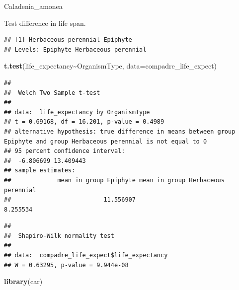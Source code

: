 \documentclass[
]{book}
\newenvironment{Shaded}{\begin{snugshade}}{\end{snugshade}}
\newcommand{\AttributeTok}[1]{\textcolor[rgb]{0.13,0.29,0.53}{#1}}
\newcommand{\CommentTok}[1]{\textcolor[rgb]{0.56,0.35,0.01}{\textit{#1}}}
\newcommand{\FunctionTok}[1]{\textcolor[rgb]{0.13,0.29,0.53}{\textbf{#1}}}
\newcommand{\NormalTok}[1]{#1}
\newcommand{\SpecialCharTok}[1]{\textcolor[rgb]{0.81,0.36,0.00}{\textbf{#1}}}
\theoremstyle{definition}
\theoremstyle{definition}
\theoremstyle{definition}
\theoremstyle{definition}
\theoremstyle{remark}
\begin{document}
Caladenia\_amonea

Test difference in life span.

\begin{Shaded}
\end{Shaded}

\begin{verbatim}
## [1] Herbaceous perennial Epiphyte            
## Levels: Epiphyte Herbaceous perennial
\end{verbatim}

\begin{Shaded}
\begin{Highlighting}[]
\FunctionTok{t.test}\NormalTok{(life\_expectancy}\SpecialCharTok{\textasciitilde{}}\NormalTok{OrganismType, }\AttributeTok{data=}\NormalTok{compadre\_life\_expect)}
\end{Highlighting}
\end{Shaded}

\begin{verbatim}
## 
##  Welch Two Sample t-test
## 
## data:  life_expectancy by OrganismType
## t = 0.69168, df = 16.201, p-value = 0.4989
## alternative hypothesis: true difference in means between group Epiphyte and group Herbaceous perennial is not equal to 0
## 95 percent confidence interval:
##  -6.806699 13.409443
## sample estimates:
##             mean in group Epiphyte mean in group Herbaceous perennial 
##                          11.556907                           8.255534
\end{verbatim}

\begin{Shaded}
\end{Shaded}

\begin{verbatim}
## 
##  Shapiro-Wilk normality test
## 
## data:  compadre_life_expect$life_expectancy
## W = 0.63295, p-value = 9.944e-08
\end{verbatim}

\begin{Shaded}
\begin{Highlighting}[]
\FunctionTok{library}\NormalTok{(car)}
\end{Highlighting}
\end{Shaded}
\end{document}
